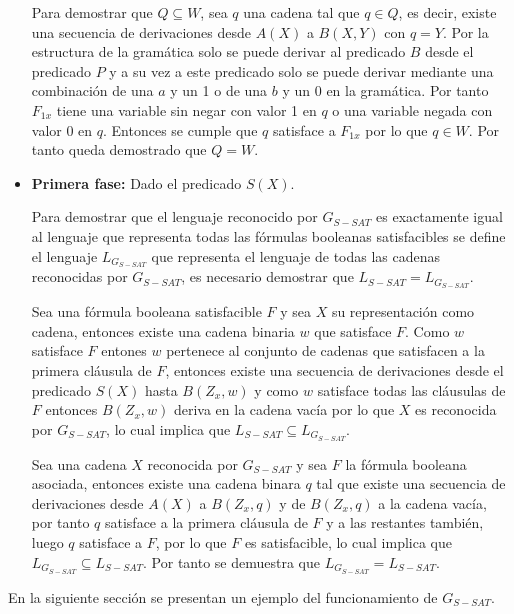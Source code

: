 \begin{itemize}
          Para demostrar que $Q\subseteq W$, sea $q$ una cadena tal que $q\in Q$, es decir, existe una secuencia de derivaciones
          desde $A(X)$ a $B(X,Y)$ con $q=Y$. Por la estructura de la gramática solo se puede derivar al predicado $B$ desde el predicado
          $P$ y a su vez a este predicado solo se puede derivar mediante una combinación de una $a$ y un 1 o de una $b$ y un 0 en la gramática. Por tanto
          $F_{1x}$ tiene una variable sin negar con valor 1 en $q$ o una variable negada con valor 0 en $q$. Entonces se cumple que $q$ satisface
          a $F_{1x}$ por lo que $q\in W$. Por tanto queda demostrado que $Q=W$.

    \item \textbf{Primera fase:} Dado el predicado $S(X)$.

          Para demostrar que el lenguaje reconocido por $G_{S-SAT}$ es exactamente igual al lenguaje que representa
          todas las fórmulas booleanas satisfacibles se define el lenguaje $L_{G_{S-SAT}}$ que representa
          el lenguaje de todas las cadenas reconocidas por $G_{S-SAT}$, es necesario demostrar que $L_{S-SAT}=L_{G_{S-SAT}}$.

          Sea una fórmula booleana satisfacible $F$ y sea $X$ su representación como cadena, entonces existe una cadena binaria
          $w$ que satisface $F$. Como $w$ satisface $F$ entones $w$ pertenece al conjunto de cadenas que satisfacen a la primera cláusula de $F$,
          entonces existe una secuencia de derivaciones desde el predicado $S(X)$ hasta $B(Z_x,w)$ y como $w$ satisface todas las cláusulas de $F$
          entonces $B(Z_x,w)$ deriva en la cadena vacía por lo que $X$ es reconocida por $G_{S-SAT}$, lo cual implica que $L_{S-SAT}\subseteq L_{G_{S-SAT}}$.

          Sea una cadena $X$ reconocida por $G_{S-SAT}$ y sea $F$ la fórmula booleana asociada, entonces existe una cadena binara $q$ tal que existe una secuencia
          de derivaciones desde $A(X)$ a $B(Z_x,q)$ y de $B(Z_x,q)$ a la cadena vacía, por tanto $q$ satisface a la primera cláusula de $F$
          y a las restantes también, luego $q$ satisface a $F$, por lo que $F$ es satisfacible, lo cual implica que $L_{G_{S-SAT}}\subseteq L_{S-SAT}$.
          Por tanto se demuestra que $L_{G_{S-SAT}}= L_{S-SAT}$.

\end{itemize}

En la siguiente sección se presentan un ejemplo del funcionamiento de $G_{S-SAT}$.

